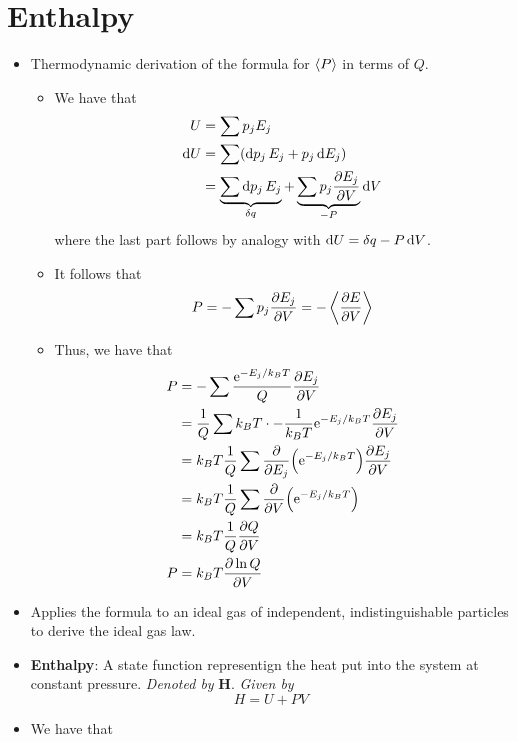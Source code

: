 \documentclass[../notes.tex]{subfiles}
\begin{document}
\section{Enthalpy}
\begin{itemize}
    \item {}Thermodynamic derivation of the formula for $\prb{P}$ in terms of $Q$.
    \begin{itemize}
        \item We have that
        \begin{align*}
            U &= \sum p_jE_j\\
            \dd{U} &= \sum(\dd{p_j}E_j+p_j\dd{E_j})\\
            &= \underbrace{\sum\dd{p_j}E_j}_{\var{q}}+\underbrace{\sum p_j\pdv{E_j}{V}}_{-P}\dd{V}
        \end{align*}
        where the last part follows by analogy with $\dd{U}=\var{q}-P\dd{V}$.
        \item It follows that
        \begin{equation*}
            P = -\sum p_j\pdv{E_j}{V} = -\prb{\pdv{E}{V}}
        \end{equation*}
        \item Thus, we have that
        \begin{align*}
            P &= -\sum\frac{\e[-E_j/k_BT]}{Q}\pdv{E_j}{V}\\
            &= \frac{1}{Q}\sum k_BT\cdot-\frac{1}{k_BT}\e[-E_j/k_BT]\pdv{E_j}{V}\\
            &= k_BT\frac{1}{Q}\sum\pdv{E_j}(\e[-E_j/k_BT])\pdv{E_j}{V}\\
            &= k_BT\frac{1}{Q}\sum\pdv{V}(\e[-E_j/k_BT])\\
            &= k_BT\frac{1}{Q}\pdv{Q}{V}\\
            P &= k_BT\pdv{\ln Q}{V}
        \end{align*}
    \end{itemize}
    \item Applies the formula to an ideal gas of independent, indistinguishable particles to derive the ideal gas law.
    \item \textbf{Enthalpy}: A state function representign the heat put into the system at constant pressure. \emph{Denoted by} $\bm{H}$. \emph{Given by}
    \begin{equation*}
        H = U+PV
    \end{equation*}
    \item We have that
    \begin{align*}

\end{align*}
\end{itemize}
\end{document}
